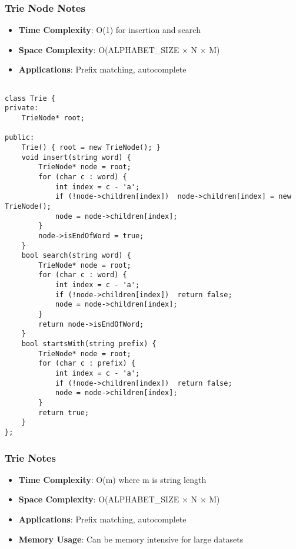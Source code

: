 \documentclass[11pt,a4paper]{article}
\begin{document}
\subsubsection{Trie Node Notes}
\begin{itemize}
\item \textbf{Time Complexity}: O(1) for insertion and search
\item \textbf{Space Complexity}: O(ALPHABET\_SIZE $\times$ N $\times$ M)
\item \textbf{Applications}: Prefix matching, autocomplete
\end{itemize}

\newpage

\begin{lstlisting}[caption={Trie Implementation}]

class Trie {
private:
    TrieNode* root;
    
public:
    Trie() { root = new TrieNode(); }
    void insert(string word) {
        TrieNode* node = root;
        for (char c : word) {
            int index = c - 'a';
            if (!node->children[index])  node->children[index] = new TrieNode();
            node = node->children[index];
        }
        node->isEndOfWord = true;
    }
    bool search(string word) {
        TrieNode* node = root;
        for (char c : word) {
            int index = c - 'a';
            if (!node->children[index])  return false;
            node = node->children[index];
        }
        return node->isEndOfWord;
    }
    bool startsWith(string prefix) {
        TrieNode* node = root;
        for (char c : prefix) {
            int index = c - 'a';
            if (!node->children[index])  return false;
            node = node->children[index];
        }
        return true;
    }
};
\end{lstlisting}

\subsubsection{Trie Notes}
\begin{itemize}
\item \textbf{Time Complexity}: O(m) where m is string length
\item \textbf{Space Complexity}: O(ALPHABET\_SIZE $\times$ N $\times$ M)
\item \textbf{Applications}: Prefix matching, autocomplete
\item \textbf{Memory Usage}: Can be memory intensive for large datasets
\end{itemize}
\end{document}
